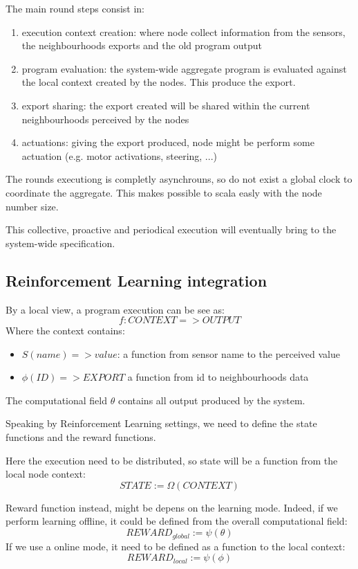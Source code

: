 \documentclass[
  twocolumn,
]{ceurart}
\begin{document}
The main round steps consist in:
\begin{enumerate}
  \item execution context creation: where node collect information from the sensors, the neighbourhoods exports and the old
  program output
  \item program evaluation: the system-wide aggregate program is evaluated against the local context created by the nodes. This produce 
  the export.
  \item export sharing: the export created will be shared within the current neighbourhoods perceived by the nodes
  \item actuations: giving the export produced, node might be perform some actuation (e.g. motor activations, steering, ...)
\end{enumerate}

The rounds executiong is completly asynchrouns, so do not exist a global clock to coordinate the aggregate. This makes possible
 to scala easly with the node number size.

This collective, proactive and periodical execution will eventually bring to the system-wide specification.

\subsection{Reinforcement Learning integration}
By a local view, a program execution can be see as:
$$
f : CONTEXT => OUTPUT
$$
Where the context contains:
\begin{itemize}
  \item $S(name) => value$: a function from sensor name to the perceived value
  \item $\phi(ID) => EXPORT$ a function from id to neighbourhoods data
\end{itemize}
The computational field $\theta$ contains all output produced by the system.

Speaking by Reinforcement Learning settings, we need to define the state functions
and the reward functions.

Here the execution need to be distributed, so state will be a function from the local node context:
$$
STATE := \Omega(CONTEXT)
$$

Reward function instead, might be depens on the learning mode. Indeed, if we perform learning offline, 
it could be defined from the overall computational field:
$$
REWARD_{global} := \psi({\theta})
$$
If we use a online mode, it need to be defined as a function to the local context:
$$
REWARD_{local} := \psi(\phi)
$$
\end{document}
